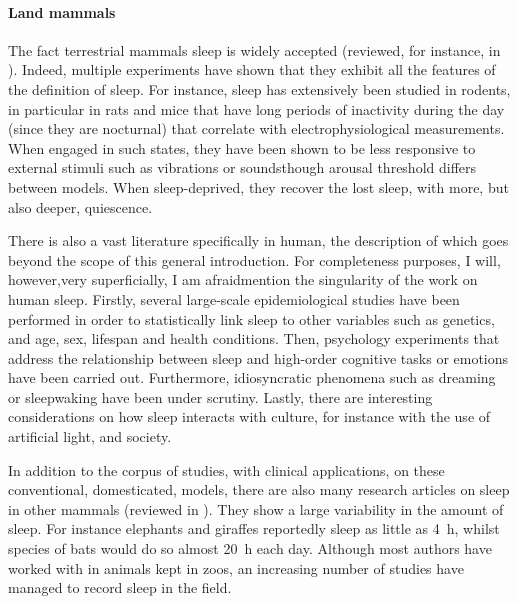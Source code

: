 \paragraph*{Land mammals}

The fact terrestrial  mammals sleep is widely accepted (reviewed, for instance, in \cite{campbell_animal_1984, elgar_sleep_1988,tobler_is_1995,nicolau_why_2000,staunton_mammalian_2005}). 
Indeed, multiple experiments have shown that they exhibit all the features of the definition of sleep.
For instance, sleep has extensively been studied in rodents, in particular in rats and mice that have long periods of inactivity during the day (since they are nocturnal) that correlate with electrophysiological measurements.
When engaged in such states, they have been shown to be less responsive to external stimuli such as vibrations\cite{davis_study_1972} or sounds\cite{neckelmann_sleep_1993}\emd{}though arousal threshold differs between models\cite{van_twyver_sleep_1969}.
When sleep-deprived, they recover the lost sleep, with more, but also deeper, quiescence\cite{mouret_paradoxical_1969,everson_sleep_1989}.

There is also a vast literature specifically in human, the description of which goes beyond the scope of this general introduction.
For completeness purposes, I will, however,\emd{}very superficially, I am afraid\emd{}mention the singularity of the work on human sleep.
Firstly, several large-scale epidemiological studies have been performed in order to statistically link sleep to other variables such as genetics\cite{partinen_genetic_1983,watson_genetic_2006}, and age, sex, lifespan and health conditions\cite{ohayon_meta-analysis_2004, kurina_sleep_2013,akerstedt_sleep_2017,akerstedt_sleep_2018}.
Then, psychology experiments that address the relationship between sleep and high-order cognitive tasks\cite{thomas_neural_2000} or emotions\cite{yoo_human_2007} have been carried out.
Furthermore, idiosyncratic phenomena such as dreaming\cite{siclari_neural_2017} or sleepwaking\cite{bakwin_sleep-walking_1970,petit_childhood_2015} have been under scrutiny.
Lastly, there are interesting considerations on how sleep interacts with culture,
for instance with the use of artificial light\cite{begemann_daylight_1997}, and society\cite{yetish_natural_2015,de_la_iglesia_access_2015}.

In addition to the corpus of studies, with clinical applications, on these conventional, domesticated, models, there are also many research articles on sleep in other mammals (reviewed in \cite{campbell_animal_1984,staunton_mammalian_2005}).
They show a large variability in the amount of sleep.
For instance elephants\cite{tobler_behavioral_1992} and giraffes\cite{tobler_behavioural_1996} reportedly sleep as little as 4~h, whilst 
species of bats would do so almost 20~h each day\cite{zepelin_mammalian_1974,campbell_animal_1984}.
Although most authors have worked with in animals kept in zoos\cite{siegel_all_2008}, an increasing number of studies have managed to record sleep in the field\cite{aulsebrook_sleep_2016}.

